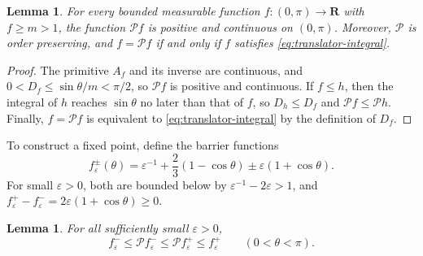 \documentclass[11pt]{article}
\numberwithin{equation}{section}
\newtheorem{lemma}[theorem]{Lemma}
\newcommand{\R}{\mathbf{R}}
\newcommand{\eps}{\varepsilon}
\begin{document}
\begin{lemma}\label{lem:Pmonotone}
For every bounded measurable function \(f:(0,\pi)\to\R\) with \(f\geq m>1\),
the function \(\mathcal P f\) is positive and continuous on \((0,\pi)\).
Moreover, \(\mathcal P\) is order preserving, and \(f=\mathcal P f\) if and
only if \(f\) satisfies \eqref{eq:translator-integral}.
\end{lemma}

\begin{proof}
The primitive \(A_f\) and its inverse are continuous, and
\(0<D_f\leq\sin\theta/m<\pi/2\), so \(\mathcal P f\) is positive and
continuous. If \(f\leq h\), then the integral of \(h\) reaches \(\sin\theta\)
no later than that of \(f\), so \(D_h\leq D_f\) and
\(\mathcal P f\leq\mathcal P h\). Finally, \(f=\mathcal P f\) is
equivalent to \eqref{eq:translator-integral} by the definition of \(D_f\).
\end{proof}

To construct a fixed point, define the barrier functions
\[
  f_\eps^\pm(\theta)=\eps^{-1}+\frac23(1-\cos\theta)\pm\eps(1+\cos\theta).
\]
For small \(\eps>0\), both are bounded below by \(\eps^{-1}-2\eps>1\), and
\(f_\eps^+-f_\eps^-=2\eps(1+\cos\theta)\geq0\).

\begin{lemma}\label{lem:barriers}
For all sufficiently small \(\eps>0\),
\[
  f_\eps^-\leq\mathcal P f_\eps^-\leq\mathcal P f_\eps^+
  \leq f_\eps^+\qquad(0<\theta<\pi).
\]
\end{lemma}
\end{document}
